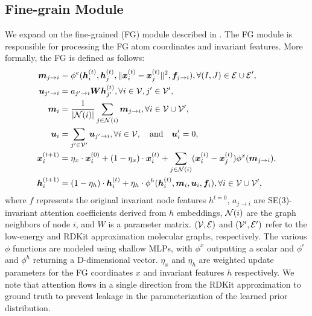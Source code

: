 \subsection{Fine-grain Module}
\label{section:eqn-fine}
\vspace{-1ex}
We expand on the fine-grained (FG) module described in . The FG module is responsible for processing the FG atom coordinates and invariant features. More formally, the FG is defined as follows:
\begin{equation}
\begin{aligned}
\bm{m}_{j\to i} &= \phi^e(\bm{h}_i^{(t)},\bm{h}_j^{(t)},\lVert\bm{x}_i^{(t)}-\bm{x}_j^{(t)}\rVert^2,\bm{f}_{j\to i}),\forall (I,J)\in {\mathcal{E}}\cup{\mathcal{E}}', \\
\bm{u}_{j'\to i} &= a_{j'\to i} \bm{W} \bm{h}_{j'}^{(t)},\forall i\in{\mathcal{V}},j'\in{\mathcal{V}}', \\
\bm{m}_i &= \frac{1}{|{\mathcal{N}}(i)|} \sum_{j\in{\mathcal{N}}(i)}\bm{m}_{j\to i},\forall i\in{\mathcal{V}}\cup{\mathcal{V}}', \\
\bm{u}_{i} &=  \sum_{j'\in{\mathcal{V}}'}\bm{u}_{j'\to i},\forall i \in{\mathcal{V}}, \quad \text{and} \quad \bm{u}'_{i} =  0, \\
\bm{x}_i^{(t+1)} &= \eta_x \cdot \bm{x}_i^{(0)} + (1 - \eta_x) \cdot \bm{x}_i^{(t)} + \sum_{j\in{\mathcal{N}}(i)} (\bm{x}_i^{(t)}-\bm{x}_j^{(t)})\phi^x(\bm{m}_{j\to i}), \\
\bm{h}_i^{(t+1)} &= (1 - \eta_h) \cdot \bm{h}_i^{(t)} + \eta_h \cdot \phi^h(\bm{h}_i^{(t)},\bm{m}_i,\bm{u}_{i}, \bm{f}_i),\forall i\in{\mathcal{V}}\cup{\mathcal{V}}',
\end{aligned}
\label{fine-grain-eqn}
\end{equation}
where $f$ represents the original invariant node features $h^{t=0}$, $a_{j\to i}$ are SE(3)-invariant attention coefficients derived from $h$ embeddings, ${\mathcal{N}}(i)$ are the graph neighbors of node $i$, and $W$ is a parameter matrix. $({\mathcal{V}}, {\mathcal{E}})$ and $({\mathcal{V}}', {\mathcal{E}}')$ refer to the low-energy and RDKit approximation molecular graphs, respectively. The various $\phi$ functions are modeled using shallow MLPs, with  $\phi^x$ outputting a scalar and $\phi^e$ and $\phi^h$ returning a D-dimensional vector. $\eta_x$ and $\eta_h$ are weighted update parameters for the FG coordinates $x$ and invariant features $h$ respectively. We note that attention flows in a single direction from the RDKit approximation to ground truth to prevent leakage in the parameterization of the learned prior distribution.  


